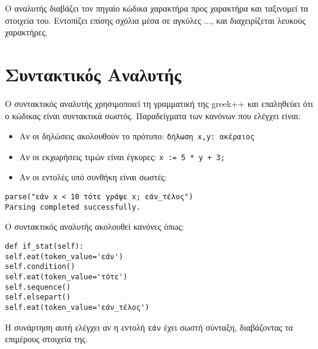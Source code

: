 \documentclass[12pt,a4paper]{article}
\begin{document}
Ο αναλυτής διαβάζει τον πηγαίο κώδικα χαρακτήρα προς χαρακτήρα και ταξινομεί τα στοιχεία του. Εντοπίζει επίσης σχόλια μέσα σε αγκύλες {...}, και διαχειρίζεται λευκούς χαρακτήρες.


\section{Συντακτικός Αναλυτής}
Ο συντακτικός αναλυτής χρησιμοποιεί τη γραμματική της greek++ και επαληθεύει ότι ο κώδικας είναι συντακτικά σωστός. Παραδείγματα των κανόνων που ελέγχει είναι:


\begin{itemize}
\item Αν οι δηλώσεις ακολουθούν το πρότυπο: \texttt{δήλωση x,y: ακέραιος}
\item Αν οι εκχωρήσεις τιμών είναι έγκυρες: \texttt{x := 5 * y + 3;}
\item Αν οι εντολές υπό συνθήκη είναι σωστές:
\end{itemize}


\begin{Verbatim}[frame=single, fontsize=\small]
parse("εάν x < 10 τότε γράψε x; εάν_τέλος")
Parsing completed successfully.
\end{Verbatim}





Ο συντακτικός αναλυτής ακολουθεί κανόνες όπως:


\begin{Verbatim}[frame=single, fontsize=\small]
def if_stat(self):
self.eat(token_value='εάν')
self.condition()
self.eat(token_value='τότε')
self.sequence()
self.elsepart()
self.eat(token_value='εάν_τέλος')
\end{Verbatim}


Η συνάρτηση αυτή ελέγχει αν η εντολή \texttt{εάν} έχει σωστή σύνταξη, διαβάζοντας τα επιμέρους στοιχεία της.
\end{document}
